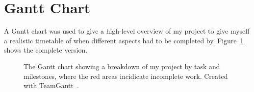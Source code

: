 
\section{Gantt Chart}

A Gantt chart was used to give a high-level overview of my project to give myself a realistic timetable of when different aspects had to be completed by. Figure~\ref{fig:gantt-chart} shows the complete version.

\newpage

\begin{landscape}
  \begin{figure}
    
    \vspace{150mm}
    \caption{The Gantt chart showing a breakdown of my project by task and milestones, where the red areas incidicate incomplete work. Created with TeamGantt~\cite{noauthor_free_nodate}.}
    \label{fig:gantt-chart}
  \end{figure}
\end{landscape}
